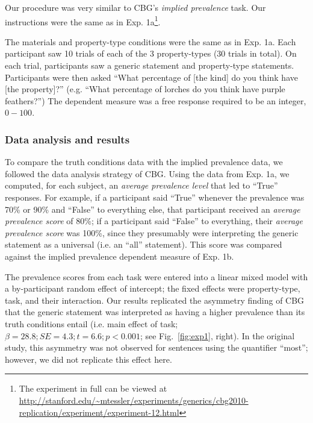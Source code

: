 \documentclass[10pt,letterpaper]{article}
\begin{document}
Our procedure was very similar to CBG's \emph{implied prevalence} task. Our instructions were the same as in Exp. 1a\footnote{The experiment in full can be viewed at \url{http://stanford.edu/~mtessler/experiments/generics/cbg2010-replication/experiment/experiment-12.html}}. 

The materials and property-type conditions were the same as in Exp. 1a. Each participant saw 10 trials of each of the 3 property-types (30 trials in total). On each trial, participants saw a generic statement and property-type statements. 
Participants were then asked ``What percentage of [the kind] do you think have [the property]?'' (e.g. ``What percentage of lorches do you think have purple feathers?'') The dependent measure was a free response required to be an integer, $0-100$. 

\subsubsection{Data analysis and results}
\label{subsec:cbganalysis}

%
To compare the truth conditions data with the implied prevalence data, we followed the data analysis strategy of CBG. Using the data from Exp. 1a, we computed, for each subject, an \emph{average prevalence level} that led to ``True'' responses. For example, if a participant said ``True'' whenever the prevalence was 70\% or 90\% and ``False'' to everything else, that participant received an \emph{average prevalence score} of 80\%; if a participant said ``False'' to everything, their \emph{average prevalence score} was 100\%, since they presumably were interpreting the generic statement as a universal (i.e. an ``all'' statement). This score was compared against the implied prevalence dependent measure of Exp. 1b. 

The prevalence scores from each task were entered into a linear mixed model with a by-participant random effect of intercept; the fixed effects were property-type, task, and their interaction. Our results replicated the asymmetry finding of CBG that the generic statement was interpreted as having a higher prevalence than its truth conditions entail (i.e. main effect of task; $\beta=28.8; SE = 4.3; t=6.6; p < 0.001$; see Fig.~\ref{fig:exp1}, right). In the original study, this asymmetry was not observed for sentences using the quantifier ``most''; however, we did not replicate this effect here.
\end{document}
